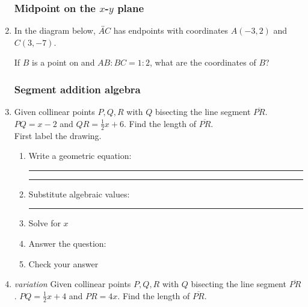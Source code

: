 \documentclass[12pt, twoside]{article}
\begin{document}
\begin{enumerate}
\subsubsection*{Midpoint on the $x$-$y$ plane}
  \item In the diagram below, $\overleftrightarrow{AC}$ has endpoints with coordinates $A(-3,2)$ and $C(3, -7)$.
    \begin{center} %
    \end{center}
    If $B$ is a point on  and $AB {:} BC = 1{:}2$,  what  are  the  coordinates
of $B$?


\subsubsection*{Segment addition algebra}
  \item Given collinear points $P, Q, R$ with $Q$ bisecting the line segment $\overline{PR}$. $PQ=x-2$ and $QR = \frac{1}{2} x+6$. Find the length of $\overline{PR}$.\\ \bigskip
    First label the drawing.
    \begin{flushright}
    \end{flushright}
    \begin{enumerate}
      \item Write a geometric equation: \rule{4cm}{0.15mm} \hspace{1cm} \rule{4cm}{0.15mm}
      \item Substitute algebraic values: \rule{4cm}{0.15mm}
      \item Solve for $x$
      \item Answer the question:
      \item Check your answer
    \end{enumerate}

    \item \emph{variation} Given collinear points $P, Q, R$ with $Q$ bisecting the line segment $\overline{PR}$. $PQ=\frac{1}{2} x+4$ and $PR = 4x$. Find the length of $\overline{PR}$.



  \end{enumerate}
\end{document}
